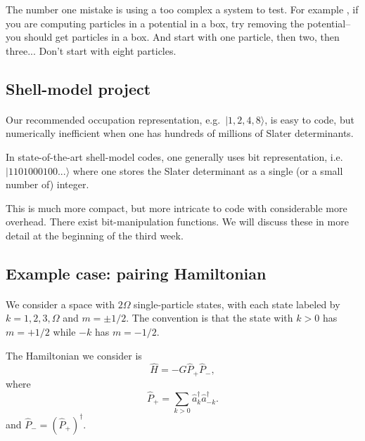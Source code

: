\documentclass[%
oneside,                 %
final,                   %
10pt]{article}
\begin{document}
\noindent
The number one mistake is using a too complex a system to test. For example ,
if you are computing particles in a potential in a box, try removing the potential--you should get 
particles in a box. And start with one particle, then two, then three... Don't start with 
eight particles.



\subsection*{Shell-model project}

\paragraph{}

Our recommended occupation representation, e.g.~$| 1,2,4,8 \rangle$, is 
easy to code, but numerically inefficient when one has hundreds of 
millions of Slater determinants.

In state-of-the-art shell-model codes, one generally uses bit 
representation, i.e.~$|1101000100... \rangle$ where one stores 
the Slater determinant as a single (or a small number of) integer.

This is much more compact, but more intricate to code with considerable 
more overhead. There exist 
bit-manipulation functions. We will discuss these in more detail at the beginning of the third week.



\subsection*{Example case: pairing Hamiltonian}

\paragraph{}

We consider a space with $2\Omega$ single-particle states, with each 
state labeled by 
$k = 1, 2, 3, \Omega$ and $m = \pm 1/2$. The convention is that 
the state with $k>0$ has $m = + 1/2$ while $-k$ has $m = -1/2$.

The Hamiltonian we consider is 
\[
\hat{H} = -G \hat{P}_+ \hat{P}_-,
\]
where
\[
\hat{P}_+ = \sum_{k > 0} \hat{a}^\dagger_k \hat{a}^\dagger_{-{k}}.
\]
and $\hat{P}_- = ( \hat{P}_+)^\dagger$.
\end{document}
